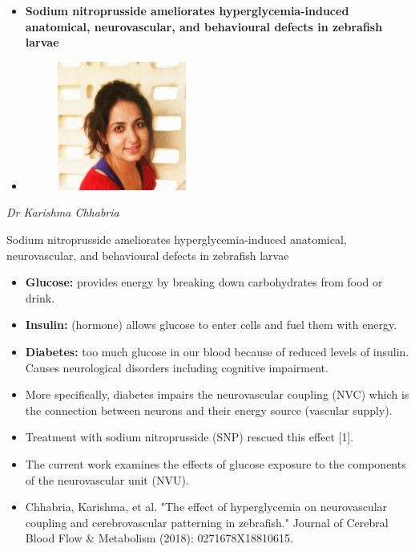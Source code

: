 \documentclass{beamer}
\newlength{\tmpShadow}
\newcommand{\MyShadow}[2]{%
	\settowidth{\tmpShadow}{#1}
	\addtolength{\tmpShadow}{.1em}
	\raisebox{-0.25ex}{\textcolor{gray!70}{#1}}%
	\kern-\tmpShadow%
	\textcolor{#2}{#1}%
}
\begin{document}
{\begin{frame}[plain,c]
	\vspace{1mm}
	\begin{center}
		\begin{itemize}
			\item<1-> \textbf{Sodium nitroprusside ameliorates hyperglycemia-induced anatomical, neurovascular, and behavioural defects in zebrafish larvae}
			\item<1->
			\begin{figure}[H]
				\centering
				\includegraphics[width=0.4\textwidth]{figures/KC}
			\end{figure}
		\end{itemize}	
		\textit{\hphantom{xxxx} Dr Karishma Chhabria}
	\end{center}
\end{frame}

\begin{frame}{Sodium nitroprusside ameliorates hyperglycemia-induced anatomical, neurovascular, and behavioural defects in zebrafish larvae}
	\begin{itemize}[label={\MyShadow{$\bullet$}{blue!80}}]
		\item<1-> \textbf{Glucose:} provides energy by breaking down carbohydrates from food or drink.
		\item<2-> \textbf{Insulin:} (hormone) allows glucose to enter cells and fuel them with energy.		
		\item<3-> \textbf{Diabetes:} too much glucose in our blood because of reduced levels of insulin. Causes neurological disorders including cognitive impairment.
	\end{itemize}
	\begin{itemize}[label={\MyShadow{$\bullet$}{red!80}}]
		\item<4-> More specifically, diabetes impairs the neurovascular coupling (NVC) which is the connection between neurons and their energy source (vascular supply).
		\item<5-> Treatment with sodium nitroprusside (SNP) rescued this effect [1].
		\item<6-> The current work examines the effects of glucose exposure to the components of the neurovascular unit (NVU).
	\end{itemize}
	\begin{itemize}
	\item<5->\tiny{Chhabria, Karishma, et al. "The effect of hyperglycemia on neurovascular coupling and cerebrovascular patterning in zebrafish." Journal of Cerebral Blood Flow \& Metabolism (2018): 0271678X18810615.}	
	\end{itemize}
\end{frame}

}
\end{document}
